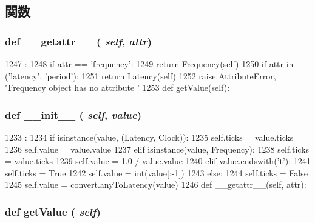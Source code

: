 \subsection{関数}
\hypertarget{classm5_1_1params_1_1Clock_a0a990b3ec3889d40889daca9ee5e4695}{
\subsubsection[{\_\-\_\-getattr\_\-\_\-}]{\setlength{\rightskip}{0pt plus 5cm}def \_\-\_\-getattr\_\-\_\- ( {\em self}, \/   {\em attr})}}
\label{classm5_1_1params_1_1Clock_a0a990b3ec3889d40889daca9ee5e4695}



\begin{DoxyCode}
1247                                :
1248         if attr == 'frequency':
1249             return Frequency(self)
1250         if attr in ('latency', 'period'):
1251             return Latency(self)
1252         raise AttributeError, "Frequency object has no attribute '%
1253 
    def getValue(self):
\end{DoxyCode}
\hypertarget{classm5_1_1params_1_1Clock_ac775ee34451fdfa742b318538164070e}{
\subsubsection[{\_\-\_\-init\_\-\_\-}]{\setlength{\rightskip}{0pt plus 5cm}def \_\-\_\-init\_\-\_\- ( {\em self}, \/   {\em value})}}
\label{classm5_1_1params_1_1Clock_ac775ee34451fdfa742b318538164070e}



\begin{DoxyCode}
1233                              :
1234         if isinstance(value, (Latency, Clock)):
1235             self.ticks = value.ticks
1236             self.value = value.value
1237         elif isinstance(value, Frequency):
1238             self.ticks = value.ticks
1239             self.value = 1.0 / value.value
1240         elif value.endswith('t'):
1241             self.ticks = True
1242             self.value = int(value[:-1])
1243         else:
1244             self.ticks = False
1245             self.value = convert.anyToLatency(value)
1246 
    def __getattr__(self, attr):
\end{DoxyCode}
\hypertarget{classm5_1_1params_1_1Clock_acc340fbd4335fa34f9d57fb454b28ed0}{
\subsubsection[{getValue}]{\setlength{\rightskip}{0pt plus 5cm}def getValue ( {\em self})}}
\label{classm5_1_1params_1_1Clock_acc340fbd4335fa34f9d57fb454b28ed0}


